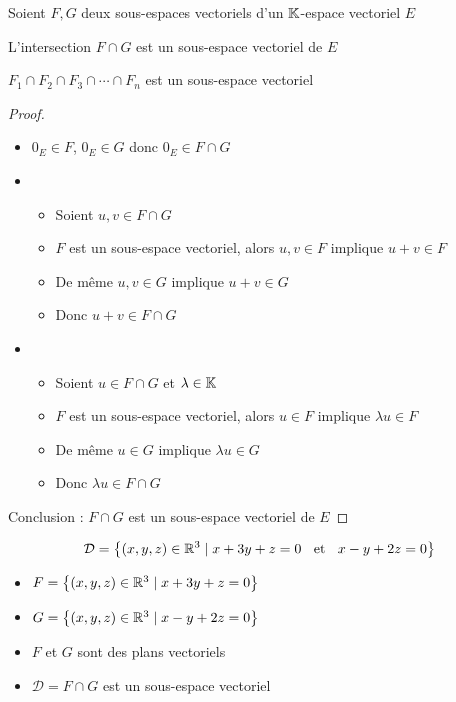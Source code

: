 \begin{frame}
Soient $F,G$ deux sous-espaces vectoriels d'un $\mathbb{K}$-espace vectoriel $E$
\begin{proposition}
L'intersection $F \cap G$ est un sous-espace vectoriel de $E$
\end{proposition}

\pause
   
$F_1 \cap F_2 \cap F_3 \cap \cdots \cap F_n$ est un sous-espace vectoriel 

\pause

\begin{proof}
\begin{itemize}
  \item $0_E \in F$, $0_E\in G$ donc $0_E \in F \cap G$
\pause  
  \item 
  \begin{itemize}
    \item Soient $u,v \in F \cap G$
    \item $F$ est un sous-espace vectoriel, alors $u,v \in F$ implique $u+v\in F$
    \item De même $u,v \in G$ implique $u+v \in G$
    \item Donc $u+v \in F \cap G$
  \end{itemize}
\pause   
  \item 
  \begin{itemize}
    \item Soient $u \in F\cap G$ et $\lambda  \in \mathbb{K}$
    \item $F$ est un sous-espace vectoriel, alors $u \in F$ implique $\lambda u \in F$
    \item De même $u \in G$ implique $\lambda u \in G$
    \item Donc $\lambda u \in F \cap G$
  \end{itemize}
\pause 
\end{itemize}
Conclusion : $F\cap G$ est un sous-espace vectoriel de $E$
\end{proof}




\end{frame}


\begin{frame}
\begin{exemple}
$$\mathcal{D}= \big\{ (x,y,z) \in \mathbb{R}^3\mid x+3y+z =0 \;\; \text{ et } \;\; x-y+2z=0 \big\}$$


\pause
\vspace*{-3ex}
 \begin{itemize}
  \item $F=\big\{ (x,y,z) \in \mathbb{R}^3\mid x+3y+z =0 \big\}$
\pause
  \item $G=\big\{ (x,y,z) \in \mathbb{R}^3 \mid x-y+2z =0 \big\}$
\pause  
  \item $F$ et $G$ sont des plans vectoriels
\pause  
  \item $\mathcal{D} =F \cap G$ est un sous-espace vectoriel
\end{itemize} 


 
\end{exemple}
\end{frame}



